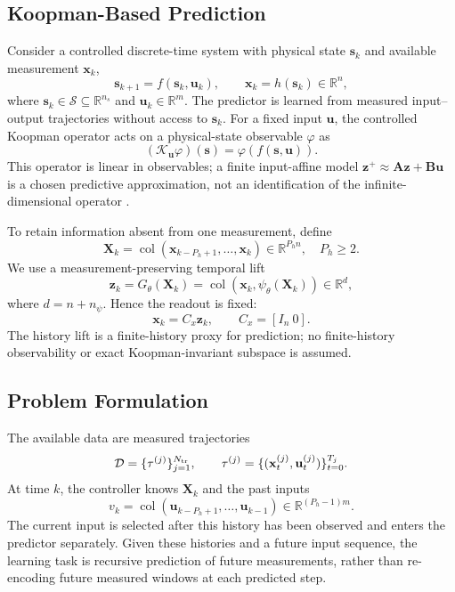 \documentclass[journal]{IEEEtran}
\newcommand{\vx}{\mathbf{x}}
\newcommand{\vu}{\mathbf{u}}
\newcommand{\vs}{\mathbf{s}}
\newcommand{\vz}{\mathbf{z}}
\newcommand{\mA}{\mathbf{A}}
\newcommand{\mB}{\mathbf{B}}
\newcommand{\mX}{\mathbf{X}}
\newcommand{\R}{\mathbb{R}}
\newcommand{\col}{\operatorname{col}}
\begin{document}
\subsection{Koopman-Based Prediction}
\label{subsec:koopman_prelim}
Consider a controlled discrete-time system with physical state $\vs_k$ and available measurement $\vx_k$,
\begin{equation}
\vs_{k+1}=f(\vs_k,\vu_k),\qquad \vx_k=h(\vs_k)\in\R^n,
\label{eq:nonlinear_system}
\end{equation}
where $\vs_k\in\mathcal S\subseteq\R^{n_s}$ and $\vu_k\in\R^m$. The predictor is learned from measured input--output trajectories without access to $\vs_k$. For a fixed input $\vu$, the controlled Koopman operator acts on a physical-state observable $\varphi$ as
\begin{equation}
(\mathcal K_{\vu}\varphi)(\vs)=\varphi(f(\vs,\vu)).
\label{eq:koopman_operator}
\end{equation}
This operator is linear in observables; a finite input-affine model $\vz^+\approx\mA\vz+\mB\vu$ is a chosen predictive approximation, not an identification of the infinite-dimensional operator \cite{proctor2018generalizing,brunton2022modern}.

To retain information absent from one measurement, define
\begin{equation}
\mX_k=\col(\vx_{k-P_h+1},\ldots,\vx_k)\in\R^{P_h n},\quad P_h\ge2.
\label{eq:measurement_window}
\end{equation}
We use a measurement-preserving temporal lift
\begin{equation}
\vz_k=G_\theta(\mX_k)=\col(\vx_k,\psi_\theta(\mX_k))\in\R^d,
\label{eq:state_preserving_lifting}
\end{equation}
where $d=n+n_\psi$. Hence the readout is fixed:
\begin{equation}
\vx_k=C_x\vz_k,\qquad C_x=[I_n\ 0].
\label{eq:state_readout}
\end{equation}
The history lift is a finite-history proxy for prediction; no finite-history observability or exact Koopman-invariant subspace is assumed.

\subsection{Problem Formulation}
\label{sec:problem}
The available data are measured trajectories
\begin{equation}
\mathcal D=\{\tau^{(j)}\}_{j=1}^{N_{\rm tr}},\qquad
\tau^{(j)}=\{(\vx_t^{(j)},\vu_t^{(j)})\}_{t=0}^{T_j}.
\label{eq:trajectory_dataset}
\end{equation}
At time $k$, the controller knows $\mX_k$ and the past inputs
\begin{equation}
v_k=\col(\vu_{k-P_h+1},\ldots,\vu_{k-1})\in\R^{(P_h-1)m}.
\label{eq:history_windows}
\end{equation}
The current input is selected after this history has been observed and enters the predictor separately. Given these histories and a future input sequence, the learning task is recursive prediction of future measurements, rather than re-encoding future measured windows at each predicted step.
\end{document}
